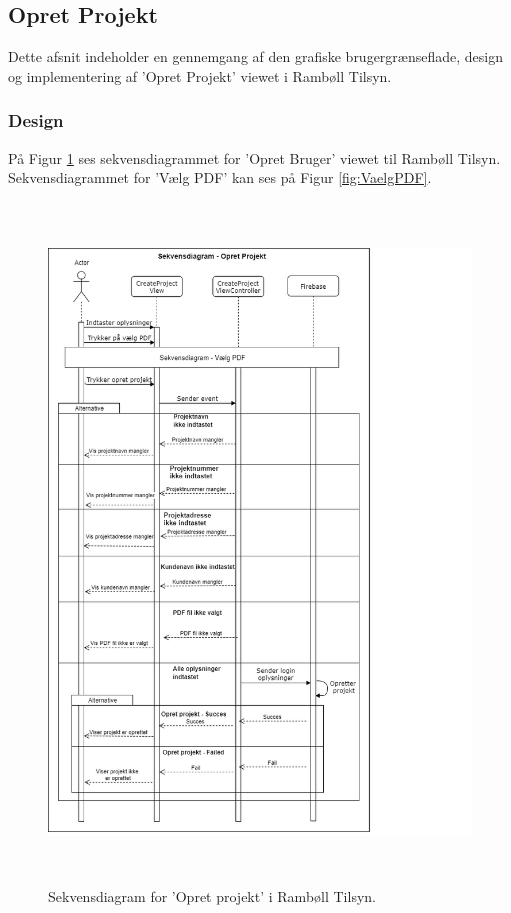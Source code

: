 \subsection{Opret Projekt}\label{sec:Opretprojekt}
Dette afsnit indeholder en gennemgang af den grafiske brugergrænseflade, design og implementering af 'Opret Projekt' viewet i Rambøll Tilsyn.

\subsubsection{Design}
På Figur \ref{fig:OpretProjektSekvens} ses sekvensdiagrammet for 'Opret Bruger' viewet til Rambøll Tilsyn. Sekvensdiagrammet for 'Vælg PDF' kan ses på Figur \ref{fig:VaelgPDF}.
\begin{figure}[H] %
	\centering
	\includegraphics[height=18cm, width=15cm]{../ArkitekturDesign/Design/OpretProjekt/OpretProjektSekvensDiagram}
	\caption{Sekvensdiagram for 'Opret projekt' i Rambøll Tilsyn.}
	\label{fig:OpretProjektSekvens}
\end{figure}

